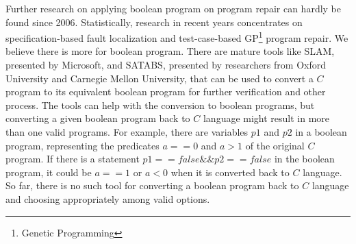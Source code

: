 Further research on applying boolean program on program repair can hardly be found since 2006.
Statistically, research in recent years concentrates on specification-based fault localization and test-case-based GP\footnote{Genetic Programming} program repair.
We believe there is more for boolean program.
There are mature tools like SLAM\cite{SLAM}, presented by Microsoft, and SATABS\cite{SATABS}, presented by researchers from Oxford University and Carnegie Mellon University,
that can be used to convert a $C$ program to its equivalent boolean program for further verification and other process.
The tools can help with the conversion to boolean programs, but converting a given boolean program back to $C$ language might result in more than one valid programs.
For example, there are variables $p1$ and $p2$ in a boolean program, representing the predicates $a == 0$ and $a > 1$ of the original $C$ program. If there is a statement $p1 == false \&\& p2 == false$ in the boolean program,
it could be $a == 1$ or $a < 0$ when it is converted back to $C$ language.
So far, there is no such tool for converting a boolean program back to $C$ language and choosing appropriately among valid options.

